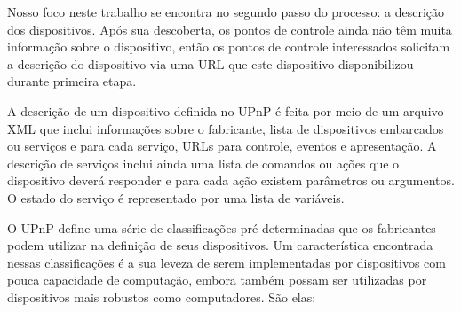 Nosso foco neste trabalho se encontra no segundo passo do processo: a descrição dos dispositivos. Após sua descoberta, os pontos de controle ainda não têm muita informação sobre o dispositivo, então os pontos de controle interessados solicitam a descrição do dispositivo via uma URL que este dispositivo disponibilizou durante primeira etapa.

A descrição de um dispositivo definida no UPnP é feita por meio de um arquivo XML que inclui informações sobre o fabricante, lista de dispositivos embarcados ou serviços e para cada serviço, URLs para controle, eventos e apresentação. A descrição de serviços inclui ainda uma lista de comandos ou ações que o dispositivo deverá responder e para cada ação existem parâmetros ou argumentos. O estado do serviço é representado por uma lista de variáveis.

O UPnP define uma série de classificações pré-determinadas que os fabricantes podem utilizar na definição de seus dispositivos. Um característica encontrada nessas classificações é a sua leveza de serem implementadas por dispositivos com pouca capacidade de computação, embora também possam ser utilizadas por dispositivos mais robustos como computadores. São elas:

